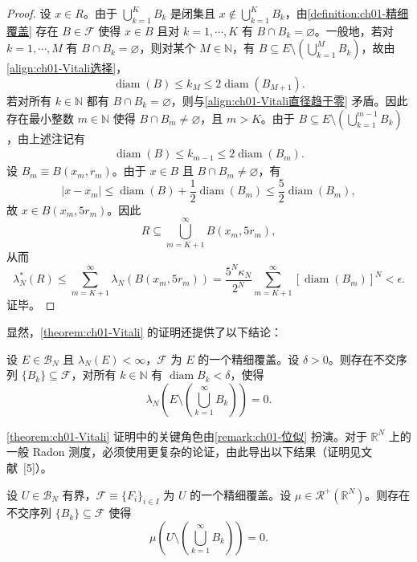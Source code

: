 \documentclass[../../main.tex]{subfiles}%
\begin{document}
\begin{proof}
设 $x\in R$。由于 $\bigcup_{k=1}^K B_k$ 是闭集且 $x\notin\bigcup_{k=1}^K B_k$，由\cref{definition:ch01-精细覆盖} 存在 $B\in\mathcal{F}$ 使得 $x\in B$ 且对 $k=1,\cdots ,K$ 有 $B\cap B_k=\varnothing $。一般地，若对 $k=1,\cdots ,M$ 有 $B\cap B_k=\varnothing $，则对某个 $M\in\mathbb{N}$，有 $B\subseteq E\setminus\left(\bigcup_{k=1}^M B_k\right)$，故由\eqref{align:ch01-Vitali选择}，
\[
\operatorname{diam}(B)\leqslant k_M\leqslant 2\operatorname{diam}(B_{M+1}).
\]
若对所有 $k\in\mathbb{N}$ 都有 $B\cap B_k=\varnothing $，则与\eqref{align:ch01-Vitali直径趋于零} 矛盾。因此存在最小整数 $m\in\mathbb{N}$ 使得 $B\cap B_m\neq\varnothing $，且 $m>K$。由于 $B\subseteq E\setminus\left(\bigcup_{k=1}^{m-1}B_k\right)$，由上述注记有
\begin{align}
\operatorname{diam}(B)\leqslant k_{m-1}\leqslant 2\operatorname{diam}(B_m). \label{align:ch01-Vitali直径估计}
\end{align}
设 $B_m\equiv B(x_m,r_m)$。由于 $x\in B$ 且 $B\cap B_m\neq\varnothing $，有
\[
|x-x_m|\leqslant\operatorname{diam}(B)+\frac{1}{2}\operatorname{diam}(B_m)\leqslant\frac{5}{2}\operatorname{diam}(B_m),
\]
故 $x\in B(x_m,5r_m)$。因此
\[
R\subseteq\bigcup_{m=K+1}^\infty B(x_m,5r_m),
\]
从而
\[
\lambda_N^*(R)\leqslant\sum_{m=K+1}^\infty\lambda_N(B(x_m,5r_m))
=\frac{5^N\kappa_N}{2^N}\sum_{m=K+1}^\infty[\operatorname{diam}(B_m)]^N<\epsilon.
\]
证毕。
\end{proof}

\begin{remark}\label{remark:ch01-Vitali精细化}
显然，\cref{theorem:ch01-Vitali} 的证明还提供了以下结论：

设 $E\in\mathcal{B}_N$ 且 $\lambda_N(E)<\infty$，$\mathcal{F}$ 为 $E$ 的一个精细覆盖。设 $\delta>0$。则存在不交序列 $\{B_k\}\subseteq\mathcal{F}$，对所有 $k\in\mathbb{N}$ 有 $\operatorname{diam}B_k<\delta$，使得
\[
\lambda_N\left(E\setminus\left(\bigcup_{k=1}^\infty B_k\right)\right)=0.
\]
\end{remark}

\cref{theorem:ch01-Vitali} 证明中的关键角色由\cref{remark:ch01-位似} 扮演。对于 $\mathbb{R}^N$ 上的一般 Radon 测度，必须使用更复杂的论证，由此导出以下结果（证明见文献~[5]）。

\begin{theorem}\label{theorem:ch01-VitaliBesicovitch}
设 $U\in\mathcal{B}_N$ 有界，$\mathcal{F}\equiv\{F_i\}_{i\in I}$ 为 $U$ 的一个精细覆盖。设 $\mu\in\mathcal{R}^+(\mathbb{R}^N)$。则存在不交序列 $\{B_k\}\subseteq\mathcal{F}$ 使得
\[
\mu\left(U\setminus\left(\bigcup_{k=1}^\infty B_k\right)\right)=0.
\]
\end{theorem}
\end{document}
